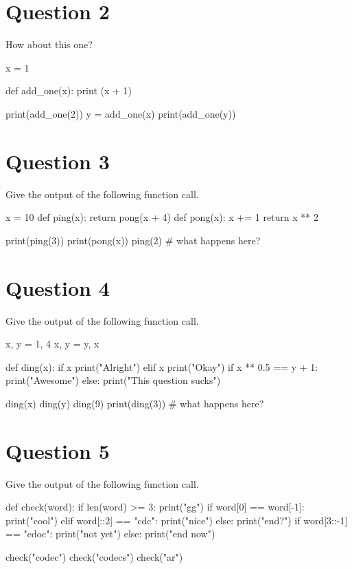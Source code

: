 \section{Question 2}
How about this one?
\begin{python}
x = 1

def add_one(x):
    print (x + 1)

print(add_one(2))
y = add_one(x)
print(add_one(y))
\end{python}

\section{Question 3}
Give the output of the following function call.
\begin{python}
x = 10
def ping(x):
    return pong(x + 4)
def pong(x):
    x += 1
    return x ** 2
  
print(ping(3))
print(pong(x))
ping(2) # what happens here?
\end{python}

\section{Question 4}
Give the output of the following function call.
\begin{python}
x, y = 1, 4
x, y = y, x

def ding(x):
    if x %
        print("Alright")
    elif x %
        print("Okay")
    if x ** 0.5 == y + 1:
        print("Awesome")
    else:
        print("This question sucks")

ding(x)
ding(y)
ding(9)
print(ding(3))  # what happens here?
\end{python}

\section{Question 5}
Give the output of the following function call.
\begin{python}
def check(word):
    if len(word) >= 3:
        print("gg")
    if word[0] == word[-1]:
        print("cool")
    elif word[::2] == "cdc":
        print("nice")
    else:
        print("end?")
    if word[3::-1] == "edoc":
        print("not yet")
    else:
        print("end now")
    
check("codec")
check("codecs")
check("ar")
\end{python}


